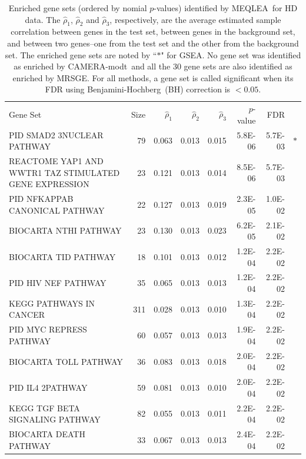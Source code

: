 \documentclass[a4,center,fleqn]{NAR}
\newcommand{\OurMethod}{MEQLEA}
\newcommand{\CMT}{CAMERA-modt}
\newcommand{\genr}{MRSGE}
\newcommand{\FDR}{Benjamini-Hochberg}
\newcommand{\FDRabb}{BH}
\begin{document}
	
	\begin{table}[!ht]
		\centering 
		\caption{Enriched gene sets (ordered by nomial $p$-values) identified by \OurMethod~for HD data.
			The $\hat\rho_1$,  $\hat\rho_2$ and $\hat\rho_3$, respectively, are the average estimated sample
			correlation between genes in the test set, between genes in the background set, and between two
			genes--one from the test set and the other from the background set. The enriched gene sets are noted
			by ``$\ast$" for GSEA. No gene set was identified as enriched by \CMT~and all the 30 gene sets are
			also identified as enriched by \genr. For all methods, a gene set is called significant when its FDR
			using \FDR~(\FDRabb) correction is $<0.05$. }
		\begin{tabular}{p{3in}rrrrrrr}
		\toprule
			Gene Set & Size & $\hat\rho_1$ & $\hat\rho_2$ & $\hat\rho_3$ & $p$-value & FDR & \\ 
			\colrule
			PID SMAD2 3NUCLEAR PATHWAY & 79 & 0.063 & 0.013 & 0.015 & 5.8E-06 & 5.7E-03 & $\ast$ \\ 
			REACTOME YAP1 AND WWTR1 TAZ STIMULATED GENE EXPRESSION & 23 & 0.121 & 0.013 & 0.014 & 8.5E-06 & 5.7E-03 &  \\ 
			PID NFKAPPAB CANONICAL PATHWAY & 22 & 0.127 & 0.013 & 0.019 & 2.3E-05 & 1.0E-02 &  \\ 
			BIOCARTA NTHI PATHWAY & 23 & 0.130 & 0.013 & 0.023 & 6.2E-05 & 2.1E-02 &  \\ 
			BIOCARTA TID PATHWAY & 18 & 0.101 & 0.013 & 0.012 & 1.2E-04 & 2.2E-02 &  \\ 
			PID HIV NEF PATHWAY & 35 & 0.065 & 0.013 & 0.013 & 1.2E-04 & 2.2E-02 &  \\ 
			KEGG PATHWAYS IN CANCER & 311 & 0.028 & 0.013 & 0.010 & 1.3E-04 & 2.2E-02 &  \\ 
			PID MYC REPRESS PATHWAY & 60 & 0.057 & 0.013 & 0.013 & 1.9E-04 & 2.2E-02 &  \\ 
			BIOCARTA TOLL PATHWAY & 36 & 0.083 & 0.013 & 0.018 & 2.0E-04 & 2.2E-02 &  \\ 
			PID IL4 2PATHWAY & 59 & 0.081 & 0.013 & 0.010 & 2.0E-04 & 2.2E-02 &  \\ 
			KEGG TGF BETA SIGNALING PATHWAY & 82 & 0.055 & 0.013 & 0.011 & 2.2E-04 & 2.2E-02 &  \\ 
			BIOCARTA DEATH PATHWAY & 33 & 0.067 & 0.013 & 0.013 & 2.4E-04 & 2.2E-02 &  \\ 

\end{tabular}
\end{table}
\end{document}
